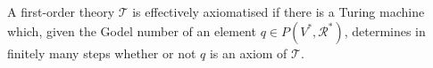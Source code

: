 A first-order theory $\mathcal{T}$ is effectively axiomatised if there is a Turing machine which, given the Godel number of an element $q \in P(V^*, \mathcal{R}^*)$, determines in finitely many steps whether or not $q$ is an axiom of $\mathcal{T}$.
